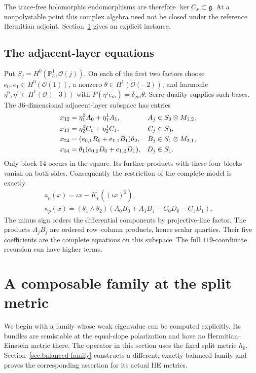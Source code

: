 \documentclass[11pt]{amsart}
\theoremstyle{definition}
\theoremstyle{remark}
\newcommand{\PP}{\mathbb P}
\newcommand{\cO}{\mathcal O}
\begin{document}
The trace-free holomorphic endomorphisms are therefore
$\ker C_x\subset\mathfrak g$. At a nonpolystable point this complex
algebra need not be closed under the reference Hermitian adjoint.
Section~\ref{sec:fixed-example} gives an explicit instance.

\subsection{The adjacent-layer equations}
Put $S_j=H^0(\PP^1_3,\cO(j))$. On each of the first two factors
choose $e_0,e_1\in H^0(\cO(1))$, a nonzero
$\theta\in H^1(\cO(-2))$, and harmonic
$\eta^0,\eta^1\in H^1(\cO(-3))$ with
$P(\eta^je_m)=\delta_{jm}\theta$. Serre duality supplies such bases.
The $36$-dimensional adjacent-layer subspace has entries
\begin{align}
 x_{12}&=\eta_1^0A_0+\eta_1^1A_1,&A_j&\in S_3\otimes M_{1,2},\notag\\
 x_{13}&=\eta_2^0C_0+\eta_2^1C_1,&C_j&\in S_3,\notag\\
 x_{24}&=(e_{0,1}B_0+e_{1,1}B_1)\theta_2,&B_j&\in S_1\otimes M_{2,1},\notag\\
 x_{34}&=\theta_1(e_{0,2}D_0+e_{1,2}D_1),&D_j&\in S_1.\label{eq:adjacent-blocks}
\end{align}
Only block $14$ occurs in the square. Its further products with these
four blocks vanish on both sides. Consequently the restriction of the
complete model is exactly
\begin{gather}
 a_p(x)=\iota x-K_p((\iota x)^2),\label{eq:adjacent-reconstruction}\\
 \kappa_p(x)=(\theta_1\wedge\theta_2)
 (A_0B_0+A_1B_1-C_0D_0-C_1D_1).\label{eq:adjacent-obstruction}
\end{gather}
The minus sign orders the differential components by projective-line
factor. The products $A_jB_j$ are ordered row--column products, hence
scalar quartics. Their five coefficients are the complete equations on
this subspace. The full $119$-coordinate recursion can have higher terms.

\section{A composable family at the split metric}\label{sec:fixed-example}

We begin with a family whose weak eigenvalue can be computed explicitly.
Its bundles are semistable at the equal-slope polarization and have no
Hermitian--Einstein metric there. The operator in this section uses the
fixed split metric $h_0$. Section~\ref{sec:balanced-family} constructs a
different, exactly balanced family and proves the corresponding assertion
for its actual HE metrics.
\end{document}
